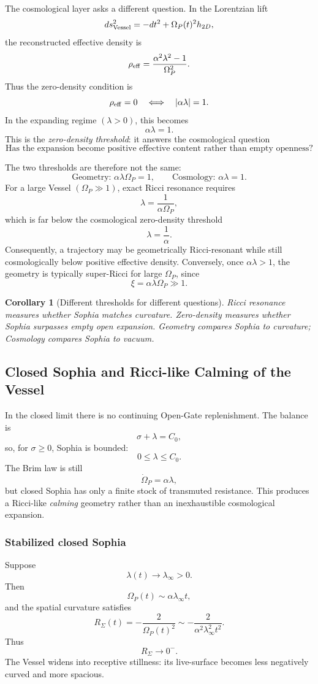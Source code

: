 \documentclass[11pt,a4paper]{article}
\newcommand{\Op}{\Omega_P}
\theoremstyle{plain}
\newtheorem{corollary}{Corollary}
\theoremstyle{remark}
\theoremstyle{definition}
\begin{document}
The cosmological layer asks a different question. In the Lorentzian lift
\[
ds^2_{\rm Vessel}=-dt^2+\Op(t)^2h_{2D},
\]
the reconstructed effective density is
\[
\rho_{\rm eff}=\frac{\alpha^2\lambda^2-1}{\Op^2}.
\]
Thus the zero-density condition is
\[
\rho_{\rm eff}=0
\quad\Longleftrightarrow\quad
|\alpha\lambda|=1.
\]
In the expanding regime \((\lambda>0)\), this becomes
\[
\boxed{\alpha\lambda=1.}
\]
This is the \emph{zero-density threshold}: it answers the cosmological question
\[
\text{Has the expansion become positive effective content rather than empty openness?}
\]

The two thresholds are therefore not the same:
\[
\boxed{\text{Geometry: }\alpha\lambda\Op=1,}
\qquad
\boxed{\text{Cosmology: }\alpha\lambda=1.}
\]
For a large Vessel \((\Op\gg1)\), exact Ricci resonance requires
\[
\lambda=\frac{1}{\alpha\Op},
\]
which is far below the cosmological zero-density threshold
\[
\lambda=\frac{1}{\alpha}.
\]
Consequently, a trajectory may be geometrically Ricci-resonant while still cosmologically
below positive effective density. Conversely, once \(\alpha\lambda>1\), the geometry is typically
super-Ricci for large \(\Op\), since
\[
\xi=\alpha\lambda\Op\gg1.
\]

\begin{corollary}[Different thresholds for different questions]
Ricci resonance measures whether Sophia matches curvature. Zero-density measures whether Sophia
surpasses empty open expansion. Geometry compares Sophia to curvature; Cosmology compares Sophia
to vacuum.
\end{corollary}

\subsection{Closed Sophia and Ricci-like Calming of the Vessel}\label{sec:closed-sophia}

In the closed limit there is no continuing Open-Gate replenishment. The balance is
\[
\sigma+\lambda=C_0,
\]
so, for \(\sigma\ge0\), Sophia is bounded:
\[
0\le\lambda\le C_0.
\]
The Brim law is still
\[
\dot\Op=\alpha\lambda,
\]
but closed Sophia has only a finite stock of transmuted resistance. This produces a Ricci-like
\emph{calming} geometry rather than an inexhaustible cosmological expansion.

\subsubsection*{Stabilized closed Sophia}
Suppose
\[
\lambda(t)\to\lambda_\infty>0.
\]
Then
\[
\Op(t)\sim\alpha\lambda_\infty t,
\]
and the spatial curvature satisfies
\[
R_\Sigma(t)=-\frac{2}{\Op(t)^2}
\sim
-\frac{2}{\alpha^2\lambda_\infty^2t^2}.
\]
Thus
\[
R_\Sigma\to0^-.
\]
The Vessel widens into receptive stillness: its live-surface becomes less negatively curved and
more spacious.
\end{document}
